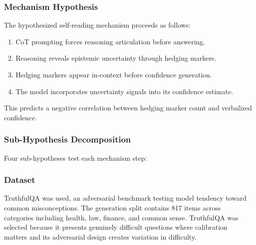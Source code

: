 
\subsubsection{Mechanism Hypothesis}

The hypothesized self-reading mechanism proceeds as follows:

\begin{enumerate}
\item CoT prompting forces reasoning articulation before answering.
\item Reasoning reveals epistemic uncertainty through hedging markers.
\item Hedging markers appear in-context before confidence generation.
\item The model incorporates uncertainty signals into its confidence estimate.
\end{enumerate}

This predicts a negative correlation between hedging marker count and verbalized confidence.

\subsubsection{Sub-Hypothesis Decomposition}

Four sub-hypotheses test each mechanism step:

\begin{table}[htbp]
\centering
{}
\end{table}

\subsubsection{Dataset}

TruthfulQA \citep{lin2022teaching} was used, an adversarial benchmark testing model tendency toward common misconceptions. The generation split contains 817 items across categories including health, law, finance, and common sense. TruthfulQA was selected because it presents genuinely difficult questions where calibration matters and its adversarial design creates variation in difficulty.

